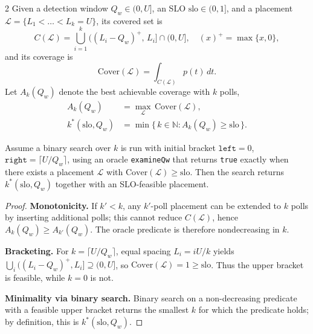 \begin{reptheorem}{2}
Given a detection window $Q_w\in(0,U]$, an SLO $\text{slo}\in(0,1]$, and
a placement $\mathcal{L}=\{L_1<\dots<L_k=U\}$, its covered set is
\[
C(\mathcal{L})=\bigcup_{i=1}^{k}\big((L_i-Q_w)^+,\,L_i\big]\cap(0,U],
\quad (x)^+=\max\{x,0\},
\]
and its coverage is
\[
\mathrm{Cover}(\mathcal{L})=\int_{C(\mathcal{L})}\!p(t)\,dt.
\]
Let $A_k(Q_w)$ denote the best achievable coverage with $k$ polls,
\[
\begin{aligned}
A_k(Q_w) &= \max_{\mathcal{L}}\, \mathrm{Cover}(\mathcal{L}),\\
k^*(\text{slo},Q_w) &= \min\{\,k\in\mathbb{N}: A_k(Q_w)\ge \text{slo}\,\}.
\end{aligned}
\]

Assume a binary search over $k$ is run with initial bracket $\texttt{left}=0$, $\texttt{right}=\lceil U/Q_w\rceil$,
using an oracle \texttt{examineQw} that returns \texttt{true} exactly when there exists a placement $\mathcal{L}$ with $\mathrm{Cover}(\mathcal{L})\ge \text{slo}$.
Then the search returns $k^*(\text{slo},Q_w)$ together with an SLO-feasible placement.
\end{reptheorem}
\newpage
\begin{proof}
\noindent\textbf{Monotonicity.} If $k'<k$, any $k'$-poll placement can be extended to $k$ polls by inserting additional polls; this cannot reduce $C(\mathcal{L})$, hence $A_k(Q_w)\ge A_{k'}(Q_w)$. The oracle predicate is therefore nondecreasing in $k$.

\noindent\textbf{Bracketing.} For $k=\lceil U/Q_w\rceil$, equal spacing $L_i=iU/k$ yields $\bigcup_i ((L_i-Q_w)^+,L_i]\supseteq(0,U]$, so $\mathrm{Cover}(\mathcal{L})=1\ge \text{slo}$. Thus the upper bracket is feasible, while $k=0$ is not.

\noindent\textbf{Minimality via binary search.} Binary search on a non-decreasing predicate with a feasible upper bracket returns the smallest $k$ for which the predicate holds; by definition, this is $k^*(\text{slo},Q_w)$.
\end{proof}